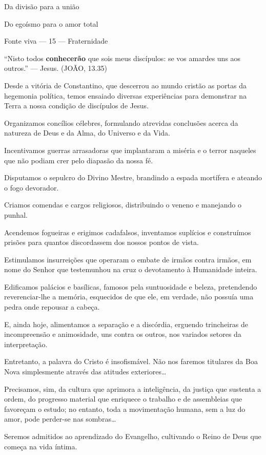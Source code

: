 \documentclass{rbfin}
\begin{document}
\begin{multicols}{2}
Da divisão para a união

Do egoísmo para o amor total

\dotfill

Fonte viva — 15 --- Fraternidade

“Nisto todos \textbf{conhecerão} que sois meus discípulos: se vos amardes uns aos outros.” — Jesus. (JOÃO, 13.35)

Desde a vitória de Constantino, que descerrou ao mundo cristão as portas da hegemonia política, temos ensaiado diversas experiências para demonstrar na Terra a nossa condição de discípulos de Jesus.

Organizamos concílios célebres, formulando atrevidas conclusões acerca da natureza de Deus e da Alma, do Universo e da Vida.

\newpage

Incentivamos guerras arrasadoras que implantaram a miséria e o terror naqueles que não podiam crer pelo diapasão da nossa fé.

Disputamos o sepulcro do Divino Mestre, brandindo a espada mortífera e ateando o fogo devorador.

Criamos comendas e cargos religiosos, distribuindo o veneno e manejando o punhal.

Acendemos fogueiras e erigimos cadafalsos, inventamos suplícios e construímos prisões para quantos discordassem dos nossos pontos de vista.

Estimulamos insurreições que operaram o embate de irmãos contra irmãos, em nome do Senhor que testemunhou na cruz o devotamento à Humanidade inteira.

Edificamos palácios e basílicas, famosos pela suntuosidade e beleza, pretendendo reverenciar-lhe a memória, esquecidos de que ele, em verdade, não possuía uma pedra onde repousar a cabeça.

E, ainda hoje, alimentamos a separação e a discórdia, erguendo trincheiras de incompreensão e animosidade, uns contra os outros, nos variados setores da interpretação.

Entretanto, a palavra do Cristo é insofismável. Não nos faremos titulares da Boa Nova simplesmente através das atitudes exteriores…

Precisamos, sim, da cultura que aprimora a inteligência, da justiça que sustenta a ordem, do progresso material que enriquece o trabalho e de assembleias que favoreçam o estudo; no entanto, toda a movimentação humana, sem a luz do amor, pode perder-se nas sombras…

Seremos admitidos ao aprendizado do Evangelho, cultivando o Reino de Deus que começa na vida íntima.


\end{multicols}
\end{document}
